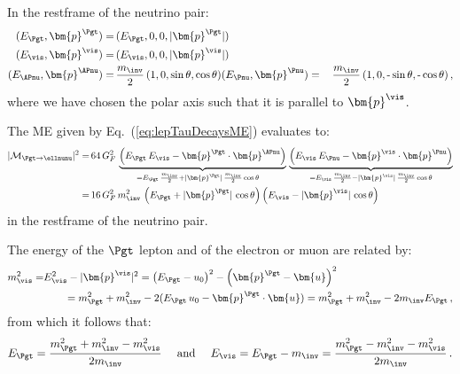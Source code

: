 In the restframe of the neutrino pair:
\begin{align}
( E_{\Pgt}, \bm{p}^{\Pgt} ) = & \, ( E_{\Pgt}, 0, 0, \vert\bm{p}^{\Pgt}\vert ) \nonumber \\
( E_{\vis}, \bm{p}^{\vis} ) = & \, ( E_{\vis}, 0, 0,
\vert\bm{p}^{\vis}\vert ) \nonumber \\
( E_{\APnu}, \bm{p}^{\APnu} ) = & \, \frac{m_{\inv}}{2} \, ( 1, 0, \sin\theta, \cos\theta ) \nonumber 
( E_{\Pnu}, \bm{p}^{\Pnu} ) = & \, \frac{m_{\inv}}{2} \, ( 1, 0, \mbox{-}\sin\theta, \mbox{-}\cos\theta ) \, , \nonumber \\
\end{align}
where we have chosen the polar axis such that it is parallel to $\bm{p}^{\vis}$.

The ME given by Eq.~(\ref{eq:lepTauDecaysME}) evaluates to:
\begin{align}
\vert\mathcal{M}_{\Pgt \to \ellnunu}\vert^{2} 
 = & \, 64 \, G^{2}_{F} \, 
  \underbrace{\left( E_{\Pgt} \, E_{\vis} - \bm{p}^{\Pgt} \cdot \bm{p}^{\APnu} \right)}_{= E_{\Pgt} \, \frac{m_{\inv}}{2} + \vert\bm{p}^{\Pgt}\vert \, \frac{m_{\inv}}{2} \cos\theta \quad} \,
  \underbrace{\left( E_{\vis} \, E_{\Pnu} - \bm{p}^{\vis} \cdot \bm{p}^{\Pnu} \right)}_{= E_{\vis} \, \frac{m_{\inv}}{2} - \vert\bm{p}^{\vis}\vert \, \frac{m_{\inv}}{2} \cos\theta} \nonumber \\
 = & \, 16 \, G^{2}_{F} \, m^{2}_{\inv} \, \left( E_{\Pgt} + \vert\bm{p}^{\Pgt}\vert \, \cos\theta \right)  \left( E_{\vis} - \vert\bm{p}^{\vis}\vert \, \cos\theta \right) 
\label{eq:lepTauDecaysMErf}
\end{align}
in the restframe of the neutrino pair.

The energy of the $\Pgt$ lepton and of the electron or muon are
related by:
\begin{align}
m^{2}_{\vis} = & E_{\vis}^{2} - \vert\bm{p}^{\vis}\vert^{2} 
 = \left( E_{\Pgt} - u_{0} \right)^{2} - \left( \bm{p}^{\Pgt} - \bm{u} \right)^{2} \nonumber \\
& \qquad
 = m^{2}_{\Pgt} + m^{2}_{\inv} - 2 (E_{\Pgt} \, u_{0} - \bm{p}^{\Pgt} \cdot \bm{u}) 
 = m^{2}_{\Pgt} + m^{2}_{\inv} - 2 m_{\inv} E_{\Pgt} \, ,
\end{align}
from which it follows that:
\begin{equation}
E_{\Pgt} = \frac{m^{2}_{\Pgt} + m^{2}_{\inv} - m^{2}_{\vis}}{2
  m_{\inv}} \quad \mbox{ and } \quad E_{\vis} = E_{\Pgt} - m_{\inv} =
\frac{m^{2}_{\Pgt} - m^{2}_{\inv} - m^{2}_{\vis}}{2 m_{\inv}} \, .
\label{eq:lepTauDecaysEn}
\end{equation}

